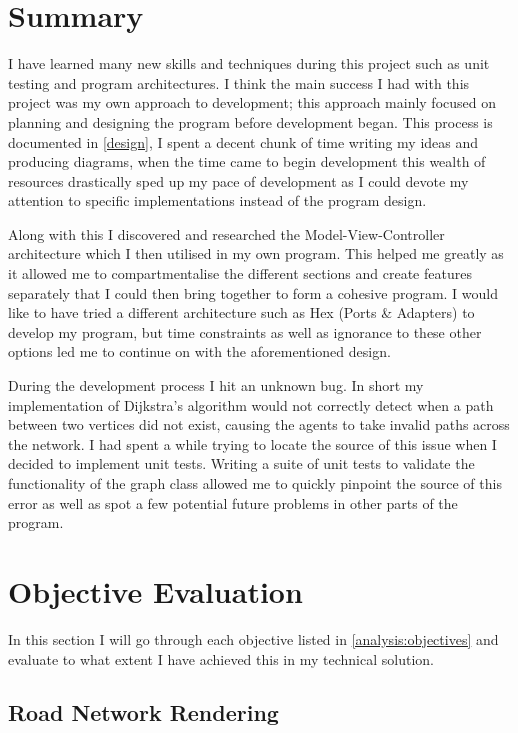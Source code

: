 \section{Summary}

    I have learned many new skills and techniques during this project such as unit testing and program architectures. I think the main success I had with this project was my own approach to development; this approach mainly focused on planning and designing the program before development began. This process is documented in \autoref{design}, I spent a decent chunk of time writing my ideas and producing diagrams, when the time came to begin development this wealth of resources drastically sped up my pace of development as I could devote my attention to specific implementations instead of the program design.

    Along with this I discovered and researched the Model-View-Controller architecture which I then utilised in my own program. This helped me greatly as it allowed me to compartmentalise the different sections and create features separately that I could then bring together to form a cohesive program. I would like to have tried a different architecture such as Hex (Ports \& Adapters) to develop my program, but time constraints as well as ignorance to these other options led me to continue on with the aforementioned design.

    During the development process I hit an unknown bug. In short my implementation of Dijkstra's algorithm would not correctly detect when a path between two vertices did not exist, causing the agents to take invalid paths across the network. I had spent a while trying to locate the source of this issue when I decided to implement unit tests. Writing a suite of unit tests to validate the functionality of the graph class allowed me to quickly pinpoint the source of this error as well as spot a few potential future problems in other parts of the program.

\section{Objective Evaluation}

    In this section I will go through each objective listed in \autoref{analysis:objectives} and evaluate to what extent I have achieved this in my technical solution.

    \subsection{Road Network Rendering}

